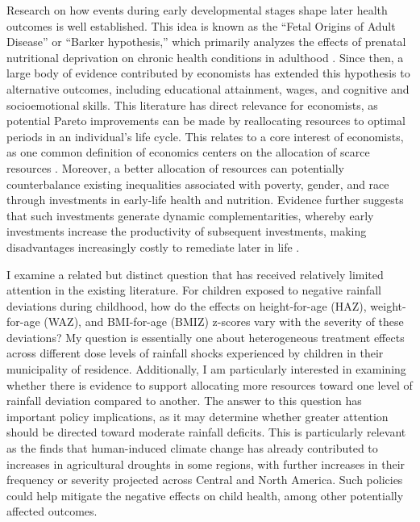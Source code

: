 Research on how events during early developmental stages shape later health outcomes is well established. This idea is known as the ``Fetal Origins of Adult Disease'' or ``Barker hypothesis,'' which primarily analyzes the effects of prenatal nutritional deprivation on chronic health conditions in adulthood \parencite{barkerMothersBabiesHealth1998}. Since then, a large body of evidence contributed by economists has extended this hypothesis to alternative outcomes, including educational attainment, wages, and cognitive and socioemotional skills. This literature has direct relevance for economists, as potential Pareto improvements can be made by reallocating resources to optimal periods in an individual's life cycle. This relates to a core interest of economists, as one common definition of economics centers on the allocation of scarce resources \parencite{backhouseRetrospectivesDefinitionEconomics2009}. Moreover, a better allocation of resources can potentially counterbalance existing inequalities associated with poverty, gender, and race through investments in early-life health and nutrition. Evidence further suggests that such investments generate dynamic complementarities, whereby early investments increase the productivity of subsequent investments, making disadvantages increasingly costly to remediate later in life \parencite{cunhaInterpretingEvidenceLife2006,cunhaTechnologySkillFormation2007}.

I examine a related but distinct question that has received relatively limited attention in the existing literature. For children exposed to negative rainfall deviations during childhood, how do the effects on height-for-age (HAZ), weight-for-age (WAZ), and BMI-for-age (BMIZ) z-scores vary with the severity of these deviations? My question is essentially one about heterogeneous treatment effects across different dose levels of rainfall shocks experienced by children in their municipality of residence. Additionally, I am particularly interested in examining whether there is evidence to support allocating more resources toward one level of rainfall deviation compared to another. The answer to this question has important policy implications, as it may determine whether greater attention should be directed toward moderate rainfall deficits. This is particularly relevant as the \textcite{ipccSummaryPolicymakers2021} finds that human-induced climate change has already contributed to increases in agricultural droughts in some regions, with further increases in their frequency or severity projected across Central and North America. Such policies could help mitigate the negative effects on child health, among other potentially affected outcomes.

